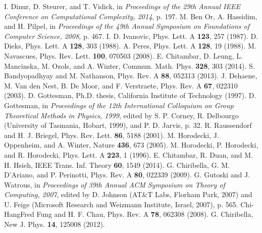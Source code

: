 \documentclass[aps,prx,twocolumn,showpacs,amsmath,notitlepage,amssymb,superscriptaddress]{revtex4-1}
\begin{document}
\begin{thebibliography}{99}
 I. Dinur, D. Steurer, and T. Vidick, in {\it Proceedings of the 29th Annual IEEE Conference on Computational Complexity, 2014}, p. 197.
 M. Ben Or, A. Hassidim, and H. Pilpel, in {\it Proceedings of the 49th Annual Symposium on Foundations of Computer Science, 2008}, p. 467.
 I. D. Ivanovic, Phys. Lett. A {\bf 123}, 257 (1987).
 D. Dieks, Phys. Lett. A {\bf 128}, 303 (1988).
 A. Peres, Phys. Lett. A {\bf 128}, 19 (1988).
 M. Navascues, Phys. Rev. Lett. {\bf 100}, 070503 (2008).
E. Chitambar, D. Leung, L. Mancinska, M. Ozols, and A. Winter, Commun. Math. Phys. {\bf 328}, 303 (2014).
 S. Bandyopadhyay and M. Nathanson, Phys. Rev. A {\bf 88}, 052313 (2013).
 J. Dehaene, M. Van den Nest, B. De Moor, and F. Verstraete, Phys. Rev. A {\bf 67}, 022310  (2003). 
 D. Gottesman, Ph.D. thesis, California Institute of Technology (1997).
 D. Gottesman, in {\it Proceedings of the 12th International Colloquium on Group Theoretical Methods in Physics, 1999}, edited by S. P. Corney, R. Delbourgo (University of Tasmania, Hobart, 1999), and P. D. Jarvis, p. 32.
 R. Raussendorf and H. J. Briegel, Phys. Rev. Lett. {\bf 86}, 5188 (2001).
 M. Horodecki, J. Oppenheim, and A. Winter, Nature {\bf 436}, 673 (2005).
 M. Horodecki, P. Horodecki, and R. Horodecki, Phys. Lett. A {\bf 223}, 1 (1996).
 E. Chitambar, R. Duan, and M. H. Hsieh, IEEE Trans. Inf. Theory {\bf 60}, 1549 (2014).
 G. Chiribella, G. M. D’Ariano, and P. Perinotti, Phys. Rev. A {\bf 80}, 022339 (2009).
 G. Gutoski and J. Watrous, in {\it Proceedings of 39th Annual ACM Symposium on Theory of Computing, 2007}, edited by D. Johnson (AT\&T Labs, Florham Park, 2007) and U. Feige (Microsoft Research and Weizmann Institute, Israel, 2007), p. 565.
 Chi-HangFred Fung and H. F. Chau, Phys. Rev. A {\bf 78}, 062308 (2008).
 G. Chiribella, New J. Phys. {\bf 14}, 125008 (2012).
\end{thebibliography}
\end{document}
